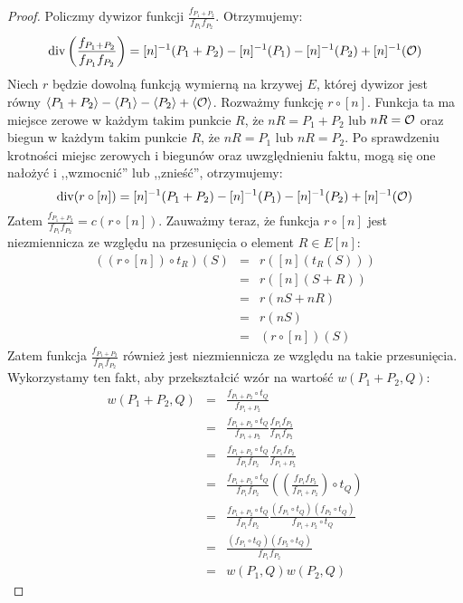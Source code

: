 \begin{proof}
Policzmy dywizor funkcji $\frac{f_{P_1 + P_2}}{f_{P_1}f_{P_2}}$.
Otrzymujemy:
\begin{equation*}
\operatorname{div}\left(\frac{f_{P_1 + P_2}}{f_{P_1}f_{P_2}}\right) =
[n]^{-1}(P_1 + P_2) - [n]^{-1}(P_1) - [n]^{-1}(P_2) + [n]^{-1}(\mathcal{O})
\end{equation*}
Niech $r$ będzie dowolną funkcją wymierną na krzywej $E$,
której dywizor jest równy
$\left\langle P_1 + P_2\right\rangle - \left\langle P_1\right\rangle - \left\langle P_2\right\rangle + \left\langle\mathcal{O}\right\rangle$.
Rozważmy funkcję $r \circ [n]$.
Funkcja ta ma miejsce zerowe w każdym takim punkcie $R$,
że $nR = P_1 + P_2$ lub $nR = \mathcal{O}$
oraz biegun w każdym takim punkcie $R$,
że $nR = P_1$ lub $nR = P_2$.
Po sprawdzeniu krotności miejsc zerowych i biegunów
oraz uwzględnieniu faktu,
mogą się one nałożyć i ,,wzmocnić'' lub ,,znieść'',
otrzymujemy:
\begin{equation*}
\operatorname{div}(r \circ [n]) =
[n]^{-1}(P_1 + P_2) - [n]^{-1}(P_1) - [n]^{-1}(P_2) + [n]^{-1}(\mathcal{O})
\end{equation*}
Zatem $\frac{f_{P_1 + P_2}}{f_{P_1}f_{P_2}} = c(r \circ [n])$.
Zauważmy teraz, że funkcja $r \circ [n]$ jest niezmiennicza
ze względu na przesunięcia o element $R \in E[n]$:
\begin{eqnarray*}
((r \circ [n]) \circ t_R)(S)
& = & r([n](t_R(S))) \\
& = & r([n](S + R)) \\
& = & r(nS + nR) \\
& = & r(nS) \\
& = & (r \circ [n])(S)
\end{eqnarray*}
Zatem funkcja $\frac{f_{P_1 + P_2}}{f_{P_1}f_{P_2}}$
również jest niezmiennicza ze względu na takie przesunięcia.
Wykorzystamy ten fakt, aby przekształcić wzór na wartość $w(P_1 + P_2, Q)$:
\begin{eqnarray*}
w(P_1 + P_2, Q)
& = & \frac{f_{P_1 + P_2} \circ t_Q}{f_{P_1 + P_2}} \\
& = & \frac{f_{P_1 + P_2} \circ t_Q}{f_{P_1 + P_2}}
      \frac{f_{P_1}f_{P_2}}{f_{P_1}f_{P_2}} \\
& = & \frac{f_{P_1 + P_2} \circ t_Q}{f_{P_1}f_{P_2}}
      \frac{f_{P_1}f_{P_2}}{f_{P_1 + P_2}} \\
& = & \frac{f_{P_1 + P_2} \circ t_Q}{f_{P_1}f_{P_2}}
      \left(\left(\frac{f_{P_1}f_{P_2}}{f_{P_1 + P_2}}\right) \circ t_Q\right)
      \\
& = & \frac{f_{P_1 + P_2} \circ t_Q}{f_{P_1}f_{P_2}}
      \frac{(f_{P_1} \circ t_Q)(f_{P_2} \circ t_Q)}{f_{P_1 + P_2} \circ t_Q} \\
& = & \frac{(f_{P_1} \circ t_Q)(f_{P_2} \circ t_Q)}{f_{P_1}f_{P_2}} \\
& = & w(P_1, Q)w(P_2, Q)
\end{eqnarray*}
\end{proof}

